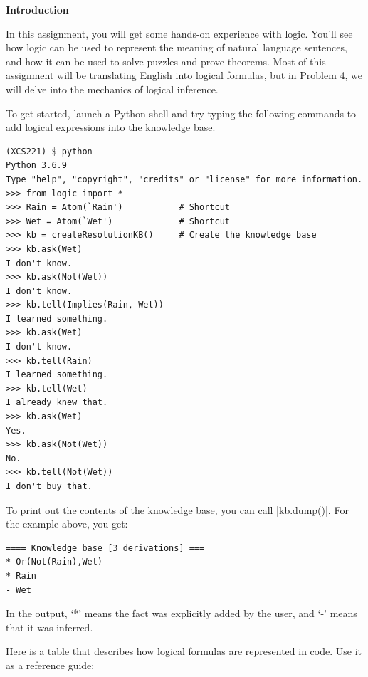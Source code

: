 {\bf Introduction}

In this assignment, you will get some hands-on experience with logic. You'll see
how logic can be used to represent the meaning of natural language sentences,
and how it can be used to solve puzzles and prove theorems. Most of this
assignment will be translating English into logical formulas, but in Problem 4,
we will delve into the mechanics of logical inference.

To get started, launch a Python shell and try typing the following commands to
add logical expressions into the knowledge base.

\begin{lstlisting}
(XCS221) $ python
Python 3.6.9
Type "help", "copyright", "credits" or "license" for more information.
>>> from logic import *
>>> Rain = Atom(`Rain')           # Shortcut
>>> Wet = Atom(`Wet')             # Shortcut
>>> kb = createResolutionKB()     # Create the knowledge base
>>> kb.ask(Wet)                   
I don't know.
>>> kb.ask(Not(Wet))              
I don't know.
>>> kb.tell(Implies(Rain, Wet))   
I learned something.
>>> kb.ask(Wet)                   
I don't know.
>>> kb.tell(Rain)                 
I learned something.
>>> kb.tell(Wet)                  
I already knew that.
>>> kb.ask(Wet)                   
Yes.
>>> kb.ask(Not(Wet))              
No.
>>> kb.tell(Not(Wet))             
I don't buy that.
\end{lstlisting}

To print out the contents of the knowledge base, you can call |kb.dump()|.
For the example above, you get:
\begin{lstlisting}
==== Knowledge base [3 derivations] ===
* Or(Not(Rain),Wet)
* Rain
- Wet
\end{lstlisting}

In the output, `*' means the fact was explicitly added by the user, and `-'
means that it was inferred.

Here is a table that describes how logical formulas are represented in code.
Use it as a reference guide:

